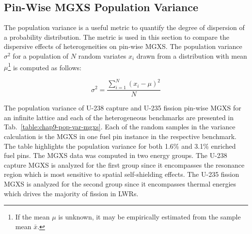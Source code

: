 \subsection{Pin-Wise MGXS Population Variance}
\label{subsec:chap9-pop-var}

The population variance is a useful metric to quantify the degree of dispersion of a probability distribution. The metric is used in this section to compare the dispersive effects of heterogeneities on pin-wise \ac{MGXS}. The population variance $\sigma^2$ for a population of $N$ random variates $x_{i}$ drawn from a distribution with mean $\mu$\footnote{If the mean $\mu$ is unknown, it may be empirically estimated from the sample mean $\bar{x}$.} is computed as follows:

\begin{equation}
\label{eqn:chap9-pop-var}
\sigma^2 = \frac{\displaystyle\sum\limits_{i=1}^{N}(x_{i} - \mu)^{2}}{N}
\end{equation}

The population variance of U-238 capture and U-235 fission pin-wise \ac{MGXS} for an infinite lattice and each of the heterogeneous benchmarks are presented in Tab.~\ref{table:chap9-pop-var-mgxs}. Each of the random samples in the variance calculation is the \ac{MGXS} in one fuel pin instance in the respective benchmark. The table highlights the population variance for both 1.6\% and 3.1\% enriched fuel pins. The \ac{MGXS} data was computed in two energy groups. The U-238 capture \ac{MGXS} is analyzed for the first group since it encompasses the resonance region which is most sensitive to spatial self-shielding effects. The U-235 fission \ac{MGXS} is analyzed for the second group since it encompasses thermal energies which drives the majority of fission in \acp{LWR}.

